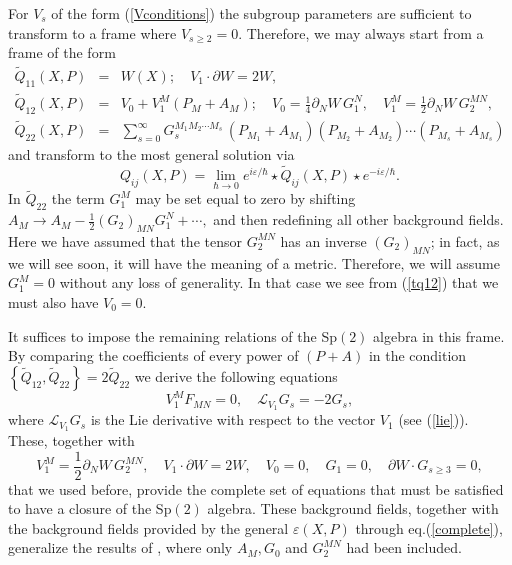 \documentclass[a4paper,12pt]{article}
\begin{document}
For $V_{s}$ of the form (\ref{Vconditions}) the subgroup parameters are
sufficient to transform to a frame where $V_{s\geq 2}=0.$ Therefore, we may
always start from a frame of the form
\begin{eqnarray}
\tilde{Q}_{11}\left( X,P\right) &=&W\left( X\right) ;\quad V_{1}\cdot
\partial W=2W,  \label{tq11} \\
\tilde{Q}_{12}\left( X,P\right) &=&V_{0}+V_{1}^{M}\left( P_{M}+A_{M}\right)
;\quad V_{0}=\frac{1}{4}\partial _{N}W\,G_{1}^{N},\quad V_{1}^{M}=\frac{1}{2}%
\partial _{N}W\,G_{2}^{MN},  \label{tq12} \\
\tilde{Q}_{22}\left( X,P\right) &=&\sum_{s=0}^{\infty
}G_{s}^{M_{1}M_{2}\cdots M_{s}}\,\left( P_{M_{1}}+A_{M_{1}}\right) \left(
P_{M_{2}}+A_{M_{2}}\right) \cdots \left( P_{M_{s}}+A_{M_{s}}\right)
\label{tq22}
\end{eqnarray}
and transform to the most general solution via
\begin{equation}
Q_{ij}\left( X,P\right) =\lim_{\hbar \rightarrow 0}e^{i\varepsilon /\hbar
}\star \tilde{Q}_{ij}\left( X,P\right) \star e^{-i\varepsilon /\hbar }.
\label{complete}
\end{equation}
In $\tilde{Q}_{22}$ the term $G_{1}^{M}$ may be set equal to zero by
shifting $A_{M}\rightarrow A_{M}-\frac{1}{2}\left( G_{2}\right)
_{MN}G_{1}^{N}+\cdots ,$ and then redefining all other background fields.
Here we have assumed that the tensor $G_{2}^{MN}$ has an inverse $\left(
G_{2}\right) _{MN}$; in fact, as we will see soon, it will have the meaning
of a metric. Therefore, we will assume $G_{1}^{M}=0$ without any loss of
generality. In that case we see from (\ref{tq12}) that we must also have $%
V_{0}=0.$

It suffices to impose the remaining relations of the Sp$\left( 2\right) $
algebra in this frame. By comparing the coefficients of every power of $%
(P+A) $ in the condition $\left\{ \tilde{Q}_{12},\tilde{Q}_{22}\right\} =2%
\tilde{Q}_{22}$ we derive the following equations
\begin{equation}
V_{1}^{M}F_{MN}=0,\quad \mathcal{L}_{V_{1}}G_{s}=-2G_{s},  \label{lv1g}
\end{equation}
where $\mathcal{L}_{V_{1}}G_{s}$ is the Lie derivative with respect to the
vector $V_{1}$ (see (\ref{lie})). These, together with
\begin{equation}
V_{1}^{M}=\frac{1}{2}\partial _{N}W\,G_{2}^{MN},\quad V_{1}\cdot \partial
W=2W,\quad V_{0}=0,\quad G_{1}=0,\quad \partial W\cdot G_{s\geq 3}=0,
\label{v1w}
\end{equation}
that we used before, provide the complete set of equations that must be
satisfied to have a closure of the Sp$\left( 2\right) $ algebra. These
background fields, together with the background fields provided by the
general $\varepsilon \left( X,P\right) $ through eq.(\ref{complete}),
generalize the results of \cite{emgrav}, where only $A_{M},G_{0}$ and $%
G_{2}^{MN}$ had been included.
\end{document}
